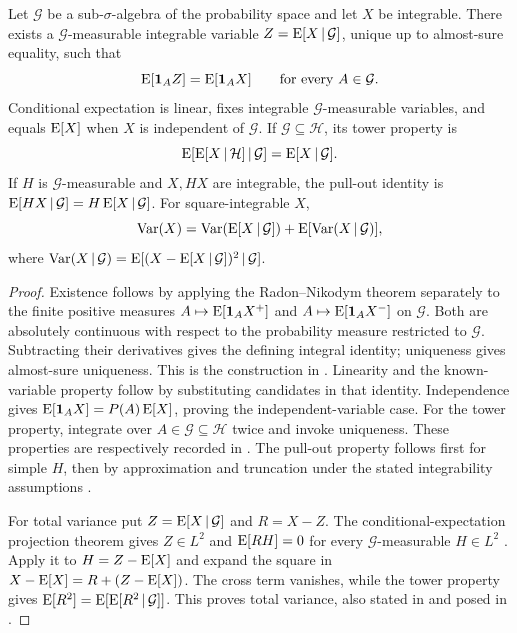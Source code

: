 \begin{theorem}
\label{thm:conditional}
Let \(\mathcal G\) be a sub-\(\sigma\)-algebra of the probability space and
let \(X\) be integrable. There exists a \(\mathcal G\)-measurable integrable
variable \(Z=\operatorname{E}[X\,\vert\,\mathcal G]\), unique up to almost-sure equality,
such that
\[
  \operatorname{E}[\mathbf{1}_A Z]=\operatorname{E}[\mathbf{1}_A X]\qquad\text{for every }A\in\mathcal G.
\]
Conditional expectation is linear, fixes integrable \(\mathcal G\)-measurable
variables, and equals \(\operatorname{E}[X]\) when \(X\) is independent of
\(\mathcal G\). If \(\mathcal G\subseteq\mathcal H\), its tower property is
\[
  \operatorname{E}[\operatorname{E}[X\,\vert\,\mathcal H]\,\vert\,\mathcal G]
  =\operatorname{E}[X\,\vert\,\mathcal G].
\]
If \(H\) is \(\mathcal G\)-measurable and \(X,HX\) are integrable, the
pull-out identity is \(\operatorname{E}[HX\,\vert\,\mathcal G]=H\operatorname{E}[X\,\vert\,\mathcal G]\).
For square-integrable \(X\),
\[
  \operatorname{Var}(X)=\operatorname{Var}(\operatorname{E}[X\,\vert\,\mathcal G])
      +\operatorname{E}[\operatorname{Var}(X\,\vert\,\mathcal G)],
\]
where
\(\operatorname{Var}(X\,\vert\,\mathcal G)
 =\operatorname{E}[(X-\operatorname{E}[X\,\vert\,\mathcal G])^2\,\vert\,\mathcal G]\).
\end{theorem}

\begin{proof}
Existence follows by applying the Radon--Nikodym theorem separately to the
finite positive measures \(A\mapsto\operatorname{E}[\mathbf{1}_A X^+]\) and
\(A\mapsto\operatorname{E}[\mathbf{1}_A X^-]\) on \(\mathcal G\). Both are absolutely
continuous with respect to the probability measure restricted to
\(\mathcal G\). Subtracting their derivatives gives the defining integral
identity; uniqueness gives almost-sure uniqueness. This is the
construction in \cite[Section~4.1 and Theorem~A.4.8]{durrett2019}.
Linearity and the known-variable property follow by substituting candidates
in that identity. Independence gives
\(\operatorname{E}[\mathbf{1}_A X]=P(A)\operatorname{E}[X]\), proving the independent-variable case.
For the tower property, integrate over \(A\in\mathcal G\subseteq\mathcal H\)
twice and invoke uniqueness. These properties are respectively recorded in
\cite[Examples~4.1.3--4.1.4 and Theorems~4.1.9(a), 4.1.13]{durrett2019}.
The pull-out property follows first for simple \(H\), then by approximation
and truncation under the stated integrability assumptions
\cite[Theorem~4.1.14]{durrett2019}.

For total variance put \(Z=\operatorname{E}[X\,\vert\,\mathcal G]\) and \(R=X-Z\).
The conditional-expectation projection theorem gives \(Z\in L^2\) and
\(\operatorname{E}[RH]=0\) for every \(\mathcal G\)-measurable \(H\in L^2\)
\cite[Theorem~4.1.15]{durrett2019}. Apply it to \(H=Z-\operatorname{E}[X]\) and expand
the square in \(X-\operatorname{E}[X]=R+(Z-\operatorname{E}[X])\). The cross term vanishes, while
the tower property gives
\(\operatorname{E}[R^2]=\operatorname{E}[\operatorname{E}[R^2\,\vert\,\mathcal G]]\). This proves total variance,
also stated in \cite[Section~4.3]{bertsekas2008} and posed in
\cite[Exercise~4.1.7]{durrett2019}.
\end{proof}

